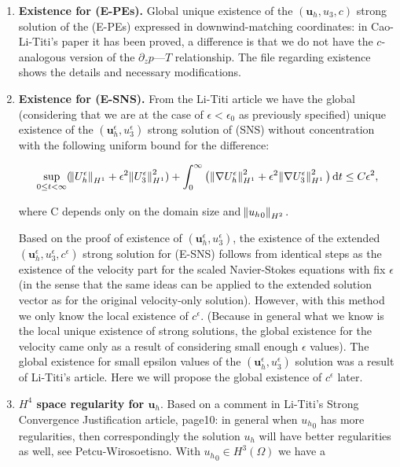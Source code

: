 \documentclass[11pt]{article}
\newcommand*\diff{\mathop{}\!\mathrm{d}}
\begin{document}
\begin{enumerate}

  \item \textbf{Existence for (E-PEs).} Global unique existence of the $(\mathbf{u}_h, u_3, c)$ strong solution of the (E-PEs) expressed in downwind-matching coordinates: in Cao-Li-Titi's paper it has been proved, a difference is that we do not have the $c$-analogous version of the $\partial_z p$---$T$ relationship. The file regarding existence shows the details and necessary modifications.

  \item \textbf{Existence for (E-SNS).} From the Li-Titi article we have the global (considering that we are at the case of $\epsilon < \epsilon_0$ as previously specified) unique existence of the $(\mathbf{u}_h^\epsilon, u_3^\epsilon)$ strong solution of (SNS) without concentration with the following uniform bound for the difference:
  
  \[ \sup_{0 \leq t < \infty} (\norm{U_h^\epsilon}_{H^1} + \epsilon^2 \norm{U_3^\epsilon}_{H^1}^2) + \int_0^\infty \big( \norm{\nabla U_h^\epsilon}_{H^1}^2 + \epsilon^2 \norm{\nabla U_3^\epsilon}_{H^1}^2 \big) \diff t \leq C \epsilon^2,\]
  
  where C depends only on the domain size and $\norm{{u_h}_0}_{H^2}.$
  
  Based on the proof of existence of $(\mathbf{u}_h^\epsilon, u_3^\epsilon)$, the existence of the extended $(\mathbf{u}_h^\epsilon, u_3^\epsilon, c^\epsilon)$ strong solution for (E-SNS) follows from identical steps as the existence of the velocity part for the scaled Navier-Stokes equations with fix $\epsilon$ (in the sense that the same ideas can be applied to the extended solution vector as for the original velocity-only solution). However, with this method we only know the local existence of $c^\epsilon.$ (Because in general what we know is the local unique existence of strong solutions, the global existence for the velocity came only as a result of considering small enough $\epsilon$ values). The global existence for small epsilon values of the $(\mathbf{u}_h^\epsilon, u_3^\epsilon)$ solution was a result of Li-Titi's article. Here we will propose the global existence of $c^\epsilon$ later.
  
  \item \textbf{$H^4$ space regularity for $\mathbf{u}_h.$} Based on a comment in Li-Titi's Strong Convergence Justification article, page10: in general when ${u_h}_0$ has more regularities, then correspondingly the solution $u_h$ will have better regularities as well, see Petcu-Wirosoetisno. With ${u_h}_0 \in H^3(\Omega)$ we have a 
  

\end{enumerate}
\end{document}
